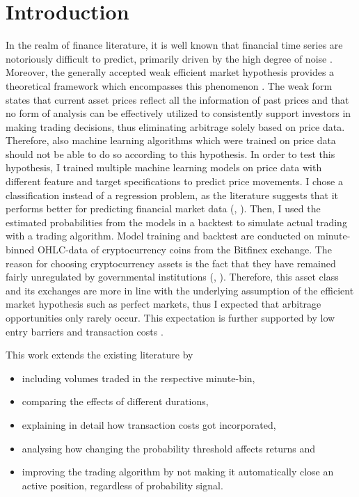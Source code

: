 \section{Introduction}
In the realm of finance literature, it is well known that financial time series
are notoriously difficult to predict, primarily driven by the high degree of noise \cite{fischer2017lstmMarketPrediction}.
Moreover, the generally accepted weak efficient market hypothesis provides a theoretical framework
which encompasses this phenomenon \cite{fama1970marketHypothesis}.
The weak form states that current asset prices reflect all the information of past prices 
and that no form of analysis can be effectively utilized to consistently support investors in making trading decisions,
thus eliminating arbitrage solely based on price data.
Therefore, also machine learning algorithms which were trained on price data 
should not be able to do so according to this hypothesis. 
In order to test this hypothesis, I trained multiple machine learning models on price data with different feature and target
specifications to predict price movements. I chose a classification instead of a regression problem, as the literature
suggests that it performs better for predicting financial market data
(\cite{leung2000classificationStockIndices}, \cite{enke2005classificationNN}).
Then, I used the estimated probabilities from the models in a backtest 
to simulate actual trading with a trading algorithm.
Model training and backtest are conducted on minute-binned OHLC-data of cryptocurrency coins from the 
Bitfinex exchange. The reason for choosing cryptocurrency assets is the fact that 
they have remained fairly unregulated by governmental institutions 
(\cite{dyhrberg2015bitcoinRegulations}, \cite{houben1994cryptoRegulation}).
Therefore, this asset class and its exchanges are more in line with the underlying assumption of the
efficient market hypothesis such as perfect markets, thus I expected that arbitrage opportunities only rarely occur. 
This expectation is further supported by low entry barriers and transaction costs \cite{bitfinex2012}.

This work extends the existing literature by

\begin{itemize}
    \item including volumes traded in the respective minute-bin,
    \item comparing the effects of different durations,
    \item explaining in detail how transaction costs got incorporated,
    \item analysing how changing the probability threshold affects returns and
    \item improving the trading algorithm by not making it automatically close an active position, regardless of probability signal.
\end{itemize}


